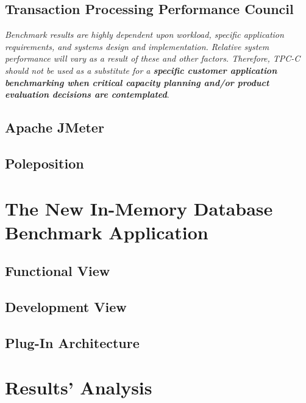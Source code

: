 	\section{Transaction Processing Performance Council}
\emph{Benchmark results are highly dependent upon workload, specific application requirements, and systems design and implementation. Relative system performance will vary as a result of these and other factors. Therefore, TPC-C should not be used as a substitute for a \bfseries{specific customer application} benchmarking when critical capacity planning and/or product evaluation decisions are contemplated}\cite{TPC-C}.
	
	\section{Apache JMeter}
	\section{Poleposition}
	
\chapter{The New In-Memory Database Benchmark Application}
	\section{Functional View}
	\section{Development View}
	\section{Plug-In Architecture}

\chapter{Results' Analysis}

